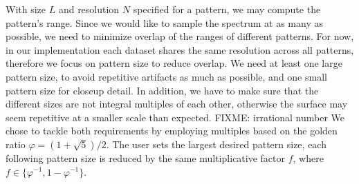 With size $L$ and resolution $N$ specified for a pattern, we may compute the
pattern's \wavenumber range. Since we would like to sample the spectrum at as
many \wavenumbers as possible, we need to minimize overlap of the \wavenumber
ranges of different patterns.
For now, in our implementation each dataset shares the same resolution across
all patterns, therefore we focus on pattern size to reduce \wavenumber overlap.
We need at least one large pattern size, to avoid repetitive artifacts as much
as possible, and one small pattern size for closeup detail.
In addition, we have to make sure that the different sizes are not integral
multiples of each other, otherwise the surface may seem repetitive at a smaller
scale than expected.
FIXME: irrational number
We chose to tackle both requirements by
employing multiples based on the golden ratio $\varphi = (1 + \sqrt{5})/2$. The
user sets the largest desired pattern size, each following pattern size is
reduced by the same multiplicative factor $f$, where $f \in \{\varphi^{-1},
1 - \varphi^{-1}\}$.
%
